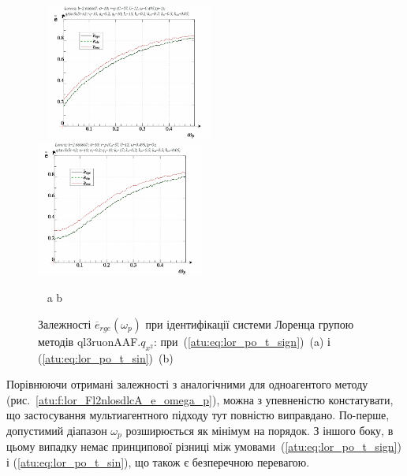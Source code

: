 \begin{figure}[ht!]
  \begin{center}
    ~ \hfill
    \includegraphics[width=0.49\textwidth]{p/cha/lor/ql3ruonAAF/lor_ql3ruonAAF_qx2-p_omega_p_e_sign.png}
    \hfill
    \includegraphics[width=0.49\textwidth]{p/cha/lor/ql3ruonAAF/lor_ql3ruonAAF_qx2-p_omega_p_e_sin.png}
    \hfill ~
  \end{center}
  \vspace{-1.0ex}
  \begin{center}
    ~ \hfill a \hfill\hfill b \hfill ~
  \end{center}
  \vspace{-1.5ex}
  \caption{Залежності $ \overline{e}_{rge} (\omega_p) $ при ідентифікації системи Лоренца групою методів ql3ruonAAF.$q_{x^2}$: при~(\ref{atu:eq:lor_po_t_sign})~(a) і (\ref{atu:eq:lor_po_t_sin})~(b)}
\label{atu:f:lor_ql3ruonAAF_e_omega_p}
\end{figure}

Порівнюючи отримані залежності з аналогічними для
одноагентого методу (рис.~\ref{atu:f:lor_Fl2nlosdlcA_e_omega_p}), можна з
упевненістю констатувати, що застосування мультиагентного
підходу тут повністю виправдано. По-перше, допустимий діапазон
$ \omega_p $ розширюється як мінімум на порядок. З іншого боку, в цьому
випадку немає принципової різниці між умовами~(\ref{atu:eq:lor_po_t_sign})
і (\ref{atu:eq:lor_po_t_sin}), що також є безперечною перевагою.




